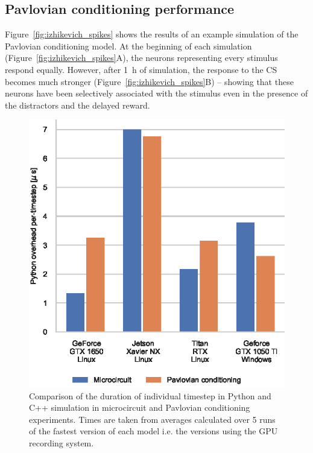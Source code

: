 \documentclass[utf8]{frontiersSCNS} %
\begin{document}
\subsection{Pavlovian conditioning performance}
Figure~\ref{fig:izhikevich_spikes} shows the results of an example simulation of the Pavlovian conditioning model.
At the beginning of each simulation (Figure~\ref{fig:izhikevich_spikes}A), the neurons representing every stimulus respond equally.
However, after \SI{1}{\hour} of simulation, the response to the CS becomes much stronger (Figure~\ref{fig:izhikevich_spikes}B) -- showing that these neurons have been selectively associated with the stimulus even in the presence of the distractors and the delayed reward.
%
\begin{figure}[t!]
    \begin{center}
        \includegraphics{figures/compare_overhead.eps}
    \end{center}
    \caption{Comparison of the duration of individual timestep in Python and C++ simulation in microcircuit and Pavlovian conditioning experiments.
    Times are taken from averages calculated over 5 runs of the fastest version of each model i.e. the versions using the GPU recording system.}
    \label{fig:compare_overhead}
\end{figure}
\end{document}
